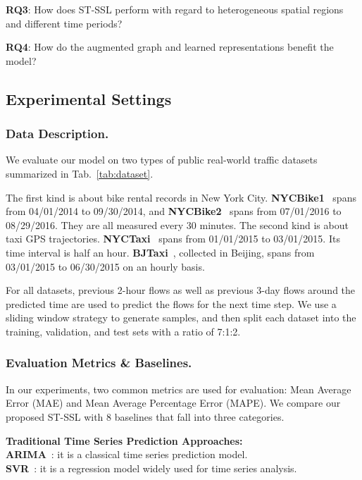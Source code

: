 \documentclass[letterpaper]{article} \usepackage{aaai23}  \usepackage{times}  \usepackage{helvet}  \usepackage{courier}  \usepackage[hyphens]{url}  \usepackage{graphicx} \urlstyle{rm} \def\UrlFont{\rm}  \usepackage{natbib}  \usepackage{caption} \frenchspacing  \setlength{\pdfpagewidth}{8.5in} \setlength{\pdfpageheight}{11in}
\newcommand{\bitem}[1]{\noindent \textbf{#1}}
\newcommand{\name}{ST-SSL\xspace}
\newcommand{\tableautorefname}{Tab.}
\begin{document}
\bitem{RQ3}: How does \name perform with regard to heterogeneous spatial regions and different time periods? 

\bitem{RQ4}: How do the augmented graph and learned representations benefit the model? 


\subsection{Experimental Settings}

\subsubsection{Data Description.} We evaluate our model on two types of public real-world traffic datasets summarized in \tableautorefname~\ref{tab:dataset}.

The first kind is about bike rental records in New York City. {\bf NYCBike1}~\cite{zhang2017deep} spans from 04/01/2014 to 09/30/2014, and {\bf NYCBike2}~\cite{yao2019revisiting} spans from 07/01/2016 to 08/29/2016. They are all measured every 30 minutes. The second kind is about taxi GPS trajectories. {\bf NYCTaxi}~\cite{yao2019revisiting} spans from 01/01/2015 to 03/01/2015. Its time interval is half an hour. {\bf BJTaxi}~\cite{zhang2017deep}, collected in Beijing, spans from 03/01/2015 to 06/30/2015 on an hourly basis. 

For all datasets, previous 2-hour flows as well as previous 3-day flows around the predicted time are used to predict the flows for the next time step. We use a sliding window strategy to generate samples, and then split each dataset into the training, validation, and test sets with a ratio of 7:1:2.

\subsubsection{Evaluation Metrics \& Baselines.} In our experiments, two common metrics are used for evaluation: Mean Average Error (MAE) and Mean Average Percentage Error (MAPE). We compare our proposed \name with 8 baselines that fall into three categories. 


{\bf \noindent Traditional Time Series Prediction Approaches:}\\
\bitem{ARIMA}~\cite{kumar2015short}: it is a
classical time series prediction model.\\
\bitem{SVR}~\cite{castro2009online}: it is a regression model widely used for time series analysis.\\\vspace{-0.12in}
\end{document}
